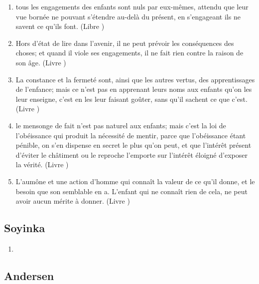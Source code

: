 \documentclass[a4paper, 11pt, hidelinks]{article}
\newcommand{\rb}[1]{\Romanbar{#1}}
\begin{document}
\begin{enumerate}
    \item tous les engagements des enfants sont nuls par eux-mêmes, attendu que leur vue bornée ne pouvant s'étendre au-delà du présent, en s'engageant ils ne savent ce qu'ils font. (Libre \rb{2})
    \item Hors d'état de lire dans l'avenir, il ne peut prévoir les conséquences des choses; et quand il viole ses engagements, il ne fait rien contre la raison de son âge. (Livre \rb{2})
    \item La constance et la fermeté sont, ainsi que les autres vertus, des apprentissages de l'enfance; mais ce n'est pas en apprenant leurs noms aux enfants qu'on les leur enseigne, c'est en les leur faisant goûter, sans qu'il sachent ce que c'est. (Livre \rb{2})
    \item le mensonge de fait n'est pas naturel aux enfants; mais c'est la loi de l'obéissance qui produit la nécessité de mentir, parce que l'obéissance étant pénible, on s'en dispense en secret le plus qu'on peut, et que l'intérêt présent d'éviter le châtiment ou le reproche l'emporte sur l'intérêt éloigné d'exposer la vérité. (Livre \rb{2}) 
    \item L'aumône et une action d'homme qui connaît la valeur de ce qu'il donne, et le besoin que son semblable en a. L'enfant qui ne connaît rien de cela, ne peut avoir aucun mérite à donner. (Livre \rb{2})
\end{enumerate}



\subsection{Soyinka}


\begin{enumerate}
    \item 
\end{enumerate}




\subsection{Andersen}
\end{document}
